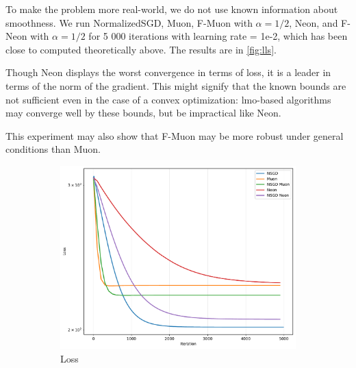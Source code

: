 \documentclass{article} %
\begin{document}
    To make the problem more real-world, we do not use known information about smoothness. We run NormalizedSGD, Muon, F-Muon with $\alpha=1/2$, Neon, and F-Neon with $\alpha=1/2$ for 5 000 iterations with learning rate = 1e-2, which has been close to computed theoretically above. The results are in \cref{fig:lls}.

    Though Neon displays the worst convergence in terms of loss, it is a leader in terms of the norm of the gradient. This might signify that the known bounds are not sufficient even in the case of a convex optimization: lmo-based algorithms may converge well by these bounds, but be impractical like Neon.

    This experiment may also show that F-Muon may be more robust under general conditions than Muon.

    
    \begin{figure}[h!]
        \centering
        \begin{subfigure}[t]{0.48\linewidth}
            \centering
            \includegraphics[width=\linewidth]{figs/simple_lls/loss_vs_iteration_50x50.pdf}
            \caption{Loss}
            \label{fig:lls_loss}
        \end{subfigure}
        \hfill
        \begin{subfigure}[t]{0.48\linewidth}
            \centering

\end{subfigure}
\end{figure}
\end{document}
